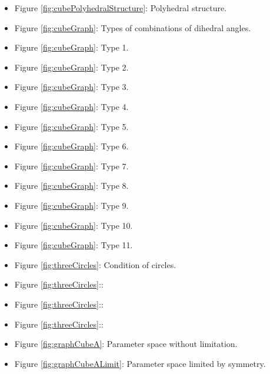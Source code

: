 \documentclass[suppldata, dvipdfmx]{interact}
\theoremstyle{plain}%
\theoremstyle{definition}
\theoremstyle{remark}
\theoremstyle{problemstyle}
\begin{document}
\begin{itemize}
\item Figure \ref{fig:cubePolyhedralStructure}: Polyhedral structure.
\item Figure \ref{fig:cubeGraph}: Types of combinations of dihedral
      angles.
\item Figure \ref{fig:cubeGraph}: Type 1.
\item Figure \ref{fig:cubeGraph}: Type 2.
\item Figure \ref{fig:cubeGraph}: Type 3.
\item Figure \ref{fig:cubeGraph}: Type 4.
\item Figure \ref{fig:cubeGraph}: Type 5.
\item Figure \ref{fig:cubeGraph}: Type 6.
\item Figure \ref{fig:cubeGraph}: Type 7.
\item Figure \ref{fig:cubeGraph}: Type 8.
\item Figure \ref{fig:cubeGraph}: Type 9.
\item Figure \ref{fig:cubeGraph}: Type 10.
\item Figure \ref{fig:cubeGraph}: Type 11.



\item Figure \ref{fig:threeCircles}: Condition of circles.
\item Figure \ref{fig:threeCircles}::
\item Figure \ref{fig:threeCircles}::
\item Figure \ref{fig:threeCircles}::

\item Figure \ref{fig:graphCubeA}: Parameter space without limitation.
\item Figure \ref{fig:graphCubeALimit}: Parameter space limited by symmetry.



\end{itemize}
\end{document}
